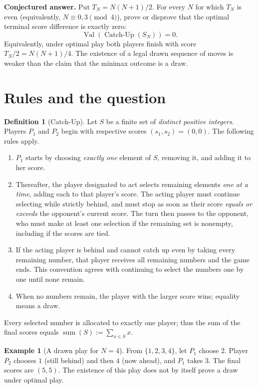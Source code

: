 \documentclass[11pt,a4paper]{article}
\theoremstyle{definition}
\newtheorem{definition}[theorem]{Definition}
\newtheorem{example}[theorem]{Example}
\theoremstyle{remark}
\newcommand{\sm}{\operatorname{sum}}
\begin{document}
\medskip\noindent
\textbf{Conjectured answer.} Put $T_N=N(N+1)/2$. For every $N$ for
which $T_N$ is even (equivalently, $N\equiv0,3\pmod4$), prove or
disprove that the optimal terminal score difference is exactly zero:
\[
\boxed{\operatorname{Val}(\operatorname{Catch\mbox{-}Up}(S_N))=0.}
\]
Equivalently, under optimal play both players finish with score
$T_N/2=N(N+1)/4$. The existence of a legal drawn sequence of moves
is weaker than the claim that the minimax outcome is a draw.


\section{Rules and the question}

\begin{definition}[Catch-Up]
Let $S$ be a finite set of \emph{distinct positive integers}.  Players
$P_1$ and $P_2$ begin with respective scores $(s_1,s_2)=(0,0)$.
The following rules apply.
\begin{enumerate}[label=(\roman*)]
\item $P_1$ starts by choosing \emph{exactly one} element of $S$,
      removing it, and adding it to her score.
\item Thereafter, the player designated to act selects remaining
      elements \emph{one at a time}, adding each to that player's score.
      The acting player must continue selecting while strictly behind,
      and must stop as soon as their score \emph{equals or exceeds} the
      opponent's current score.  The turn then passes to the opponent,
      who must make at least one selection if the remaining set is
      nonempty, including if the scores are tied.
\item If the acting player is behind and cannot catch up even by taking
      every remaining number, that player receives all remaining
      numbers and the game ends.  This convention agrees with
      continuing to select the numbers one by one until none remain.
\item When no numbers remain, the player with the larger score wins;
      equality means a draw.
\end{enumerate}
Every selected number is allocated to exactly one player; thus the
sum of the final scores equals $\sm(S):=\sum_{x\in S}x$.
\end{definition}

\begin{example}[A drawn play for $N=4$]
From $\{1,2,3,4\}$, let $P_1$ choose $2$.  Player $P_2$ chooses $1$
(still behind) and then $4$ (now ahead), and $P_1$ takes $3$.
The final scores are $(5,5)$.  The existence of this play does not
by itself prove a draw under optimal play.
\end{example}
\end{document}
